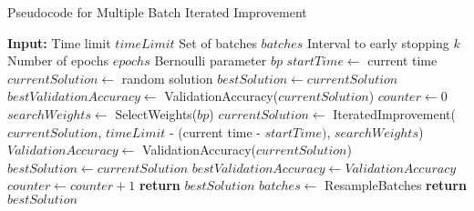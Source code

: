 \begin{algorithm}[H]
    \fontsize{12pt}{12pt}\selectfont
    \caption{Pseudocode for Multiple Batch Iterated Improvement} \label{multiple_batches}
    \begin{algorithmic}[1]
        \State \textbf{Input:}
        \State \hspace{\algorithmicindent} Time limit $timeLimit$
        \State \hspace{\algorithmicindent} Set of batches $batches$
        \State \hspace{\algorithmicindent} Interval to early stopping $k$
        \State \hspace{\algorithmicindent} Number of epochs $epochs$
        \State \hspace{\algorithmicindent} Bernoulli parameter $bp$ 
        \State $startTime \gets$ current time 
        \State $currentSolution \gets$ random solution
        \State $bestSolution \gets currentSolution$
        \State $bestValidationAccuracy \gets$ ValidationAccuracy($currentSolution$)
        \State $counter \gets 0$
                    \State $searchWeights \gets$ SelectWeights($bp$)
                    \State $currentSolution \gets$ IteratedImprovement($currentSolution$,
                    \Statex \hspace{\algorithmicindent} \hspace{\algorithmicindent}$timeLimit$ - (current time - $startTime)$, $searchWeights$)
                        \State $ValidationAccuracy \gets$ ValidationAccuracy($currentSolution$)
                            \State $bestSolution \gets currentSolution$ 
                            \State $bestValidationAccuracy \gets ValidationAccuracy$ 
                        \EndIf
                    \EndIf
                    \State $counter \gets counter + 1$
                        \State \textbf{return} $bestSolution$
                    \EndIf
                \EndFor
                \State $batches \gets$ ResampleBatches 
            \EndFor
        \EndWhile
        \State \textbf{return} $bestSolution$
    \end{algorithmic}
\end{algorithm}

